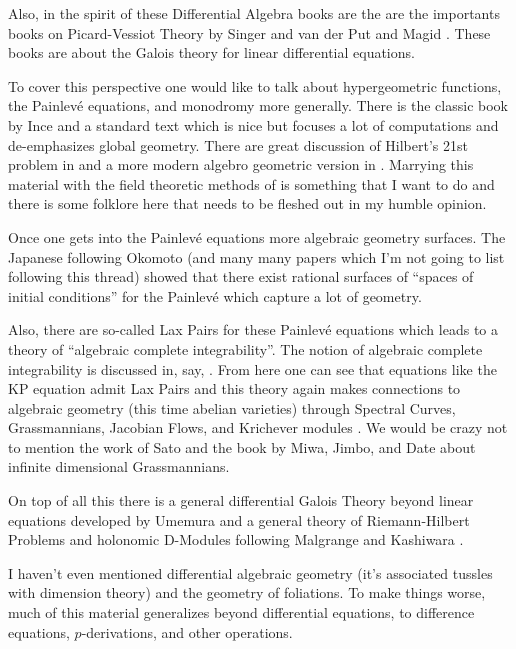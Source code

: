 \documentclass[12pt]{book}
\numberwithin{equation}{section}
\theoremstyle{definition}
\theoremstyle{remark}
\begin{document}
Also, in the spirit of these Differential Algebra books are the are the importants books on Picard-Vessiot Theory by Singer and van der Put \cite{Put2003} and Magid \cite{Magid1994}.
These books are about the Galois theory for linear differential equations.

To cover this perspective one would like to talk about hypergeometric functions, the Painlev\'{e} equations, and monodromy more generally. 
There is the classic book by Ince \cite{Ince1944} and a standard text \cite{Iwasaki1991} which is nice but focuses a lot of computations and de-emphasizes global geometry.
There are great discussion of Hilbert's 21st problem in \cite{Borel1987} and a more modern algebro geometric version in \cite{Deligne1970}.
Marrying this material with the field theoretic methods of \cite{Buium1986} is something that I want to do and there is some folklore here that needs to be fleshed out in my humble opinion.

Once one gets into the Painlev\'{e} equations more algebraic geometry surfaces. The Japanese following  Okomoto \cite{Okamoto1987b,Okamoto1987,Okamoto1986, Okamoto1987a} (and many many papers which I'm not going to list following this thread) showed that there exist rational surfaces of ``spaces of initial conditions'' for the Painlev\'{e} which capture a lot of geometry. 

Also, there are so-called Lax Pairs for these Painlev\'{e} equations which leads to a theory of ``algebraic complete integrability''. 
The notion of algebraic complete integrability is discussed in, say, \cite{Beauville1990}\cite{Adler2004}. 
From here one can see that equations like the KP equation admit Lax Pairs and this theory again makes connections to algebraic geometry (this time abelian varieties) through Spectral Curves, Grassmannians, Jacobian Flows, and Krichever modules \cite{Mulase1994}.
We would be crazy not to mention the work of Sato and the book by Miwa, Jimbo, and Date about infinite dimensional Grassmannians.

On top of all this there is a general differential Galois Theory beyond linear equations  developed by Umemura \cite{Umemura2011} and a general theory of Riemann-Hilbert  Problems and holonomic D-Modules following Malgrange and Kashiwara \cite{Borel1987}.

I haven't even mentioned differential algebraic geometry (it's associated tussles with dimension theory) and the geometry of foliations. To make things worse, much of this material generalizes beyond differential equations, to difference equations, $p$-derivations, and other operations.
\end{document}
